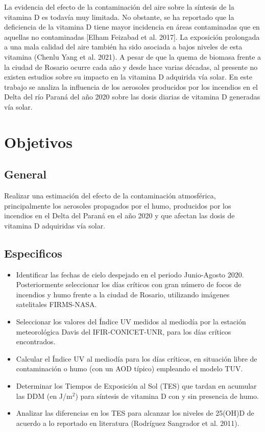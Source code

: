 La evidencia del efecto de la contaminación del aire sobre la síntesis de la vitamina D es todavía muy limitada. No obstante, se ha reportado que la deficiencia de la vitamina D tiene mayor incidencia en áreas contaminadas que en aquellas no contaminadas [Elham Feizabad et al. 2017]. La exposición prolongada a una mala calidad del aire también ha sido asociada a bajos niveles de esta vitamina (Chenlu Yang et al. 2021). A pesar de que la quema de biomasa frente a la ciudad de Rosario ocurre cada año y desde hace varias décadas, al presente no existen estudios sobre su impacto en la vitamina D adquirida vía solar. En este trabajo se analiza la influencia de los aerosoles producidos por los incendios en el Delta del río Paraná del año 2020 sobre las dosis diarias de vitamina D generadas vía solar.

\section*{Objetivos}

\subsection*{General}

Realizar una estimación del efecto de la contaminación atmosférica, principalmente los aerosoles propagados por el humo, producidos por los incendios en el Delta del Paraná en el año 2020 y que afectan las dosis de vitamina D adquiridas vía solar.

\subsection*{Especificos}

\begin{itemize}
    \item Identificar las fechas de cielo despejado en el periodo Junio-Agosto 2020. Posteriormente seleccionar los días críticos con gran número de focos de incendios y humo frente a la ciudad de Rosario, utilizando imágenes satelitales FIRMS-NASA.

    \item Seleccionar los valores del Índice UV medidos al mediodía por la estación meteorológica Davis del IFIR-CONICET-UNR, para los días críticos encontrados.

    \item Calcular el Índice UV al mediodía para los días críticos, en situación libre de contaminación o humo (con un AOD típico) empleando el modelo TUV.

    \item Determinar los Tiempos de Exposición al Sol (TES) que tardan en acumular las DDM (en J/m$^2$) para síntesis de vitamina D con y sin presencia de humo.

    \item Analizar las diferencias en los TES para alcanzar los niveles de 25(OH)D de acuerdo a lo reportado en literatura (Rodríguez Sangrador et al. 2011).
\end{itemize}

